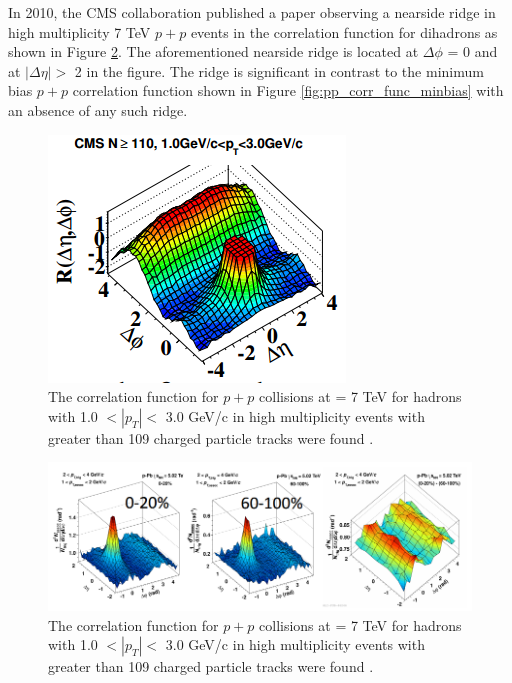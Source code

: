 In 2010, the CMS collaboration published a paper observing a nearside ridge in high multiplicity 7 TeV $p+p$ events in the correlation function for dihadrons as shown in Figure \ref{fig:pp_ridge_plot}. The aforementioned nearside ridge is located at $\Delta\phi$ = 0 and at $|\Delta\eta| > $ 2 in the figure. The ridge is significant in contrast to the minimum bias $p+p$ correlation function shown in Figure \ref{fig:pp_corr_func_minbias} with an absence of any such ridge.
\begin{figure}[h!]
\begin{center}
\includegraphics[width=0.55\linewidth]{figs/pp_high_multiplicity_ridge.PNG}
\caption{ The correlation function for $p+p$ collisions at \sqsn = 7 TeV for hadrons with 1.0 $<|p_T|<$ 3.0 GeV/c in high multiplicity events with greater than 109 charged particle tracks were found \cite{Khachatryan2010}.}
\label{fig:pp_ridge_plot}
\end{center}
\end{figure}

\begin{figure}[h!]
\begin{center}
\includegraphics[width=0.85\linewidth]{figs/pPb_subtraction_correlation.PNG}
\caption{ The correlation function for $p+p$ collisions at \sqsn = 7 TeV for hadrons with 1.0 $<|p_T|<$ 3.0 GeV/c in high multiplicity events with greater than 109 charged particle tracks were found \cite{Khachatryan2010}.}
\label{fig:pp_ridge_plot}
\end{center}
\end{figure}

